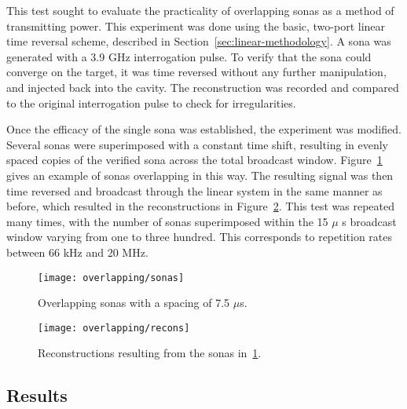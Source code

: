 This test sought to evaluate the practicality of overlapping sonas as a method of transmitting power. This experiment was done using the basic, two-port linear time reversal scheme, described in Section~\ref{sec:linear-methodology}. A sona was generated with a 3.9 GHz interrogation pulse. To verify that the sona could converge on the target, it was time reversed without any further manipulation, and injected back into the cavity. The reconstruction was recorded and compared to the original interrogation pulse to check for irregularities.

Once the efficacy of the single sona was established, the experiment was modified. Several sonas were superimposed with a constant time shift, resulting in evenly spaced copies of the verified sona across the total broadcast window. Figure~\ref{fig:overlapping-sonas} gives an example of sonas overlapping in this way. The resulting signal was then time reversed and broadcast through the linear system in the same manner as before, which resulted in the reconstructions in Figure~\ref{fig:overlapping-recons}. This test was repeated many times, with the number of sonas superimposed within the 15 $\mu$ s broadcast window varying from one to three hundred. This corresponds to repetition rates between 66 kHz and 20 MHz.

\begin{figure}[t]
\centering
\texttt{[image: overlapping/sonas]}
\caption[Overlapping sonas]{Overlapping sonas with a spacing of 7.5 $\mu$s.}
\label{fig:overlapping-sonas}
\end{figure}

\begin{figure}[t]
\centering
\texttt{[image: overlapping/recons]}
\caption[Overlapping reconstructions]{Reconstructions resulting from the sonas in~\ref{fig:overlapping-sonas}.}
\label{fig:overlapping-recons}
\end{figure}


\subsection{Results}

